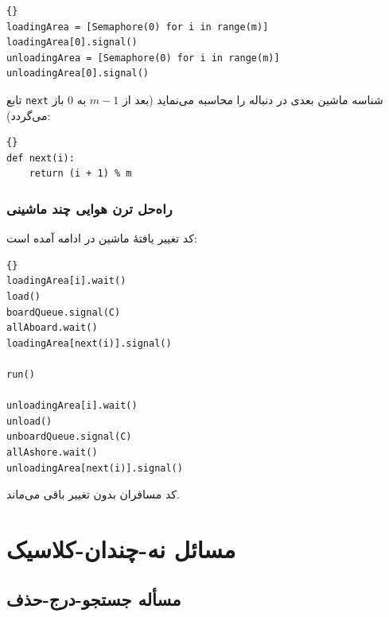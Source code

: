 \documentclass{book}
\newcommand{\clearemptydoublepage}{}%
\begin{document}
\begin{latin}
\begin{lstlisting}[title=\rl{راهنمایی ترن هوایی چند ماشینی}]{}
loadingArea = [Semaphore(0) for i in range(m)]
loadingArea[0].signal()
unloadingArea = [Semaphore(0) for i in range(m)]
unloadingArea[0].signal()
\end{lstlisting}
\end{latin}

    تابع {\tt next}  شناسه ماشین بعدی در دنباله را محاسبه می‌نماید (بعد از $m-1$ به  $0$  باز می‌گردد):

\begin{latin}
\begin{lstlisting}[title=\rl{پیاده‌سازی  {\tt next}}]{}
def next(i):
    return (i + 1) % m
\end{lstlisting}
\end{latin}



\clearemptydoublepage
\subsection{راه‌حل ترن هوایی چند ماشینی}

    کد تغییر یافتهٔ ماشین در ادامه آمده است: 

\begin{latin}
\begin{lstlisting}[title=\rl{راه‌حل ترن هوایی  چند ماشینی (ماشین)}]{} 
loadingArea[i].wait()
load()
boardQueue.signal(C)
allAboard.wait()
loadingArea[next(i)].signal()

run()

unloadingArea[i].wait()
unload()
unboardQueue.signal(C)
allAshore.wait()
unloadingArea[next(i)].signal()
\end{lstlisting}
\end{latin}

    کد مسافران بدون تغییر باقی می‌ماند. 
    


\clearemptydoublepage
\chapter{مسائل نه-چندان-کلاسیک}


\section{مسأله جستجو-درج-حذف}
\end{document}
